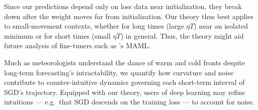 
    
            Since our predictions depend only on loss data near initialization,
            they break down after the weight moves far from initialization.  Our
            theory thus best applies to small-movement contexts, whether for long
            times (large $\eta T$) near an isolated minimum or for short times
            (small $\eta T$) in general.
            Thus, the theory might aid future analysis of fine-tuners such as 
            \cite{fi17}'s MAML.
    
                Much as meteorologists understand the dance of warm and cold
                fronts despite long-term forecasting's intractability, we
                quantify how curvature and noise contribute to
                counter-intuitive dynamics governing each short-term interval
                of SGD's trajectory.  Equipped with our theory, users of deep
                learning may refine intuitions --- e.g.\ that SGD descends on
                the training loss --- to account for noise.

